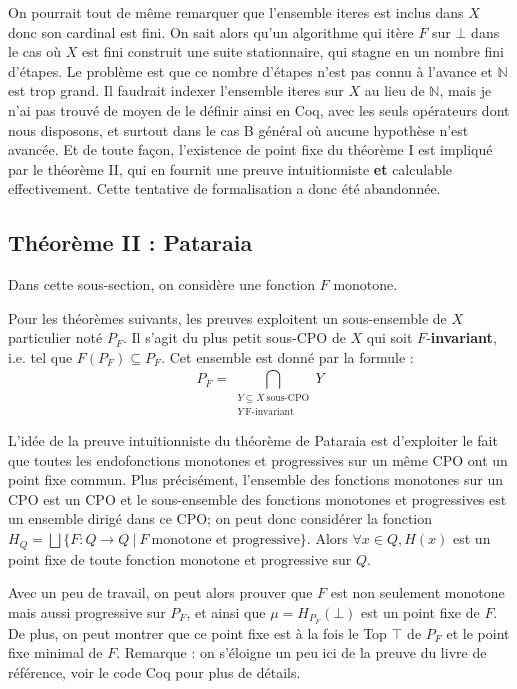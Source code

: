 \documentclass{article}
\newcommand\code[1]{{\fontfamily{lmtt}\selectfont #1}}
\theoremstyle{definition}
\begin{document}
On pourrait tout de même remarquer que l'ensemble \code{iteres} est inclus dans $X$ donc son cardinal est fini. On sait alors qu'un algorithme qui itère $F$ sur $\bot$ dans le cas où $X$ est fini construit une suite stationnaire, qui stagne en un nombre fini d'étapes. Le problème est que ce nombre d'étapes n'est pas connu à l'avance et $\mathbb{N}$ est trop grand. Il faudrait indexer l'ensemble \code{iteres} sur $X$ au lieu de $\mathbb{N}$, mais je n'ai pas trouvé de moyen de le définir ainsi en Coq, avec les seuls opérateurs dont nous disposons, et surtout dans le cas \code{B} général où aucune hypothèse n'est avancée. Et de toute façon, l'existence de point fixe du théorème I est impliqué par le théorème II, qui en fournit une preuve intuitionniste \textbf{et} calculable effectivement. Cette tentative de formalisation a donc été abandonnée.

\subsection{Théorème II : Pataraia}

Dans cette sous-section, on considère une fonction $F$ monotone. 

Pour les théorèmes suivants, les preuves exploitent un sous-ensemble de $X$ particulier noté $P_F$. Il s'agit du plus petit sous-CPO de $X$ qui soit $F$-\textbf{invariant}, i.e. tel que $F (P_F) \subseteq P_F$. Cet ensemble est donné par la formule : ~ 
$$P_F = \bigcap\limits_{\substack{Y \subseteq X ~ \text{sous-CPO}\\ Y ~ \text{F-invariant}}}^{}Y$$

L'idée de la preuve intuitionniste du théorème de Pataraia est d'exploiter le fait que toutes les endofonctions monotones et progressives sur un même CPO ont un point fixe commun. Plus précisément, l'ensemble des fonctions monotones sur un CPO est un CPO et le sous-ensemble des fonctions monotones et progressives est un ensemble dirigé dans ce CPO; on peut donc considérer la fonction $H_Q = \bigsqcup \{F : Q \rightarrow Q ~ | ~ F ~ \text{monotone et progressive} \}$. Alors $\forall x \in Q, H(x)$ est un point fixe de toute fonction monotone et progressive sur $Q$.

Avec un peu de travail, on peut alors prouver que $F$ est non seulement monotone mais aussi progressive sur $P_F$, et ainsi que $\mu = H_{P_F}(\bot)$ est un point fixe de $F$. De plus, on peut montrer que ce point fixe est à la fois le Top $\top$ de $P_F$ et le point fixe minimal de $F$. Remarque : on s'éloigne un peu ici de la preuve du livre de référence, voir le code Coq pour plus de détails.
\end{document}
